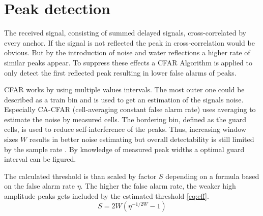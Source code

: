 \section{Peak detection}

The received signal, consisting of summed delayed signals, cross-correlated by every anchor. If the signal is not reflected the peak in cross-correlation would be obvious. But by the introduction of noise and water reflections a higher rate of similar peaks appear. To suppress these effects a CFAR Algorithm \cite{rohling11} is applied to only detect the first reflected peak resulting in lower false alarms of peaks.

CFAR works by using multiple values intervals. The most outer one could be described as a train bin and is used to get an estimation of the signals noise. Especially CA-CFAR (cell-averaging constant false alarm rate) uses averaging to estimate the noise by measured cells. The bordering bin, defined as the guard cells, is used to reduce self-interference of the peaks. Thus, increasing window sizes $W$ results in better noise estimating but overall detectability is still limited by the sample rate  \cite{rohling11}\cite{radarbasics}. By knowledge of measured peak widths a optimal guard interval can be figured.

The calculated threshold is than scaled by factor $S$ depending on a formula based on the false alarm rate $\eta$. The higher the false alarm rate, the weaker high amplitude peaks gets included by the estimated threshold \ref{eq:cff}.\\

%
\begin{equation}
	S=2W\left( \eta^{-1/{2W}}-1\right) 
	\label{eq:cff}
\end{equation}

